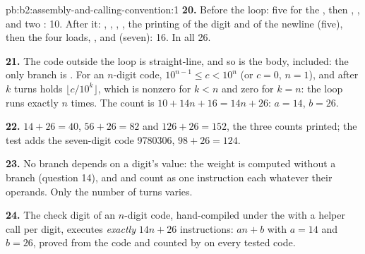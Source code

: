 \begin{solution}{pb:b2:assembly-and-calling-convention:1}
\textbf{20.} Before the loop: five for the , then , ,  and two : 10.
After it: , , , , the printing of the digit and of the newline (five), then
the four loads, ,  and  (seven): 16. In all 26.

\textbf{21.} The code outside the loop is straight-line, and so is the body,  included: the only branch is
. For an $n$-digit code, $10^{n-1} \le c < 10^n$ (or $c = 0$, $n = 1$), and after $k$ turns 
holds $\lfloor c / 10^k \rfloor$, which is nonzero for $k < n$ and zero for $k = n$: the loop runs exactly $n$ times.
The count is $10 + 14n + 16 = 14n + 26$: $a = 14$, $b = 26$.

\textbf{22.} $14 + 26 = 40$, $56 + 26 = 82$ and $126 + 26 = 152$, the three counts printed; the test adds the
seven-digit code 9780306, $98 + 26 = 124$.

\textbf{23.} No branch depends on a digit's value: the weight is computed without a branch (question 14), and
 and  count as one instruction each whatever their operands. Only the number of turns varies.

\textbf{24.} The check digit of an $n$-digit code, hand-compiled under the  with a helper call per
digit, executes \emph{exactly} $14n + 26$ instructions: $an + b$ with $a = 14$ and $b = 26$, proved from the code and
counted by  on every tested code.
\end{solution}
